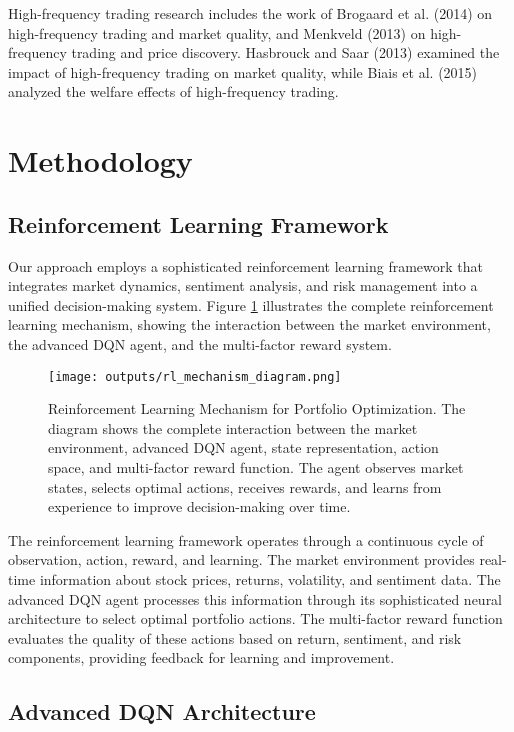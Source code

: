 \documentclass[12pt,a4paper]{article}
\begin{document}
High-frequency trading research includes the work of Brogaard et al. (2014) on high-frequency trading and market quality, and Menkveld (2013) on high-frequency trading and price discovery. Hasbrouck and Saar (2013) examined the impact of high-frequency trading on market quality, while Biais et al. (2015) analyzed the welfare effects of high-frequency trading.

\section{Methodology}

\subsection{Reinforcement Learning Framework}

Our approach employs a sophisticated reinforcement learning framework that integrates market dynamics, sentiment analysis, and risk management into a unified decision-making system. Figure \ref{fig:rl_mechanism} illustrates the complete reinforcement learning mechanism, showing the interaction between the market environment, the advanced DQN agent, and the multi-factor reward system.

\begin{figure}[H]
\centering
\texttt{[image: outputs/rl\_mechanism\_diagram.png]}
\caption{Reinforcement Learning Mechanism for Portfolio Optimization. The diagram shows the complete interaction between the market environment, advanced DQN agent, state representation, action space, and multi-factor reward function. The agent observes market states, selects optimal actions, receives rewards, and learns from experience to improve decision-making over time.}
\label{fig:rl_mechanism}
\end{figure}

The reinforcement learning framework operates through a continuous cycle of observation, action, reward, and learning. The market environment provides real-time information about stock prices, returns, volatility, and sentiment data. The advanced DQN agent processes this information through its sophisticated neural architecture to select optimal portfolio actions. The multi-factor reward function evaluates the quality of these actions based on return, sentiment, and risk components, providing feedback for learning and improvement.

\subsection{Advanced DQN Architecture}
\end{document}
